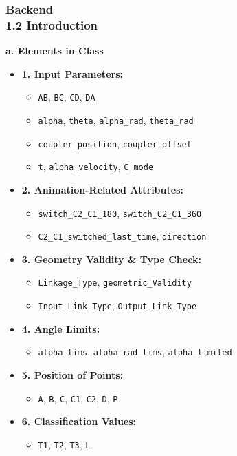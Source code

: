 \documentclass[ucs,10pt]{beamer}
\begin{document}
\begin{frame}
    \frametitle{Backend \\ \small \color{rwth-blue} 1.2 Introduction}
    \textbf{a. Elements in Class}
    \begin{itemize}
        \item \textbf{1. Input Parameters:}
        \begin{itemize}
            \item \texttt{AB}, \texttt{BC}, \texttt{CD}, \texttt{DA}
            \item \texttt{alpha}, \texttt{theta}, \texttt{alpha\_rad}, \texttt{theta\_rad}
            \item \texttt{coupler\_position}, \texttt{coupler\_offset}
            \item \texttt{t}, \texttt{alpha\_velocity}, \texttt{C\_mode}
        \end{itemize}
        \item \textbf{2. Animation-Related Attributes:}
        \begin{itemize}
            \item \texttt{switch\_C2\_C1\_180}, \texttt{switch\_C2\_C1\_360}
            \item \texttt{C2\_C1\_switched\_last\_time}, \texttt{direction}
        \end{itemize}
        \item \textbf{3. Geometry Validity \& Type Check:}
        \begin{itemize}
            \item \texttt{Linkage\_Type}, \texttt{geometric\_Validity}
            \item \texttt{Input\_Link\_Type}, \texttt{Output\_Link\_Type}
        \end{itemize}
        \item \textbf{4. Angle Limits:}
        \begin{itemize}
            \item \texttt{alpha\_lims}, \texttt{alpha\_rad\_lims}, \texttt{alpha\_limited}
        \end{itemize}
        \item \textbf{5. Position of Points:}
        \begin{itemize}
            \item \texttt{A}, \texttt{B}, \texttt{C}, \texttt{C1}, \texttt{C2}, \texttt{D}, \texttt{P}
        \end{itemize}
        \item \textbf{6. Classification Values:}
        \begin{itemize}
            \item \texttt{T1}, \texttt{T2}, \texttt{T3}, \texttt{L}
        \end{itemize}
    \end{itemize}
\end{frame}
\end{document}
